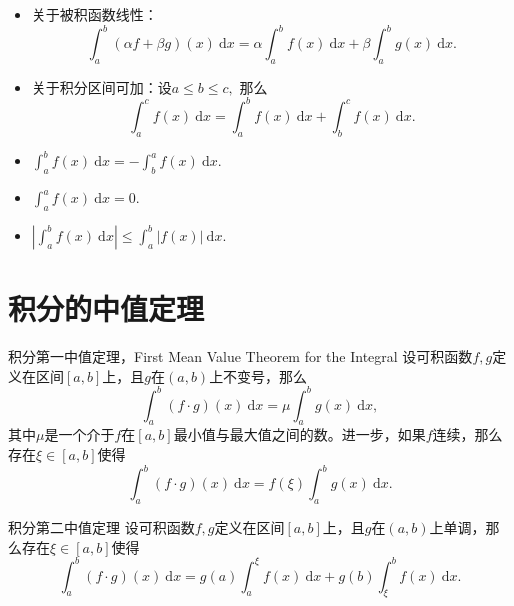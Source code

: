 \begin{frame}

\begin{itemize}
\item 关于被积函数线性：
\[\int_a^b (\alpha f + \beta g)(x) ~ \mathrm{d}x = \alpha \int_a^b f(x) ~ \mathrm{d}x + \beta \int_a^b g(x) ~ \mathrm{d}x.\]
\item 关于积分区间可加：设$a \leqslant b \leqslant c,$ 那么
\[\int_a^c f(x) ~ \mathrm{d}x = \int_a^b f(x) ~ \mathrm{d}x + \int_b^c f(x) ~ \mathrm{d}x.\]
\item \(\displaystyle \int_a^b f(x) ~ \mathrm{d}x = -\int_b^a f(x) ~ \mathrm{d}x.\)
\item \(\displaystyle \int_a^a f(x) ~ \mathrm{d}x = 0.\)
\item \(\displaystyle \left|\int_a^b f(x) ~ \mathrm{d}x\right| \leqslant \int_a^b |f(x)| ~ \mathrm{d}x.\)
\end{itemize}

\end{frame}


\section{积分的中值定理}


\begin{frame}

\begin{block}{积分第一中值定理，First Mean Value Theorem for the Integral}
设可积函数$f,g$定义在区间$[a,b]$上，且$g$在$(a,b)$上不变号，那么
\[\int_a^b (f\cdot g)(x) ~ \mathrm{d}x = \mu\int_a^b g(x) ~ \mathrm{d}x,\]
其中$\mu$是一个介于$f$在$[a,b]$最小值与最大值之间的数。进一步，如果$f$连续，那么存在$\xi \in [a,b]$使得
\[\int_a^b (f\cdot g)(x) ~ \mathrm{d}x = f(\xi)\int_a^b g(x) ~ \mathrm{d}x.\]
\end{block}

\end{frame}


\begin{frame}

\begin{block}{积分第二中值定理}
设可积函数$f,g$定义在区间$[a,b]$上，且$g$在$(a,b)$上单调，那么存在$\xi \in [a,b]$使得
\[\int_a^b (f\cdot g)(x) ~ \mathrm{d}x = g(a)\int_a^{\xi} f(x) ~ \mathrm{d}x + g(b)\int_{\xi}^b f(x) ~ \mathrm{d}x.\]
\end{block}

\end{frame}

